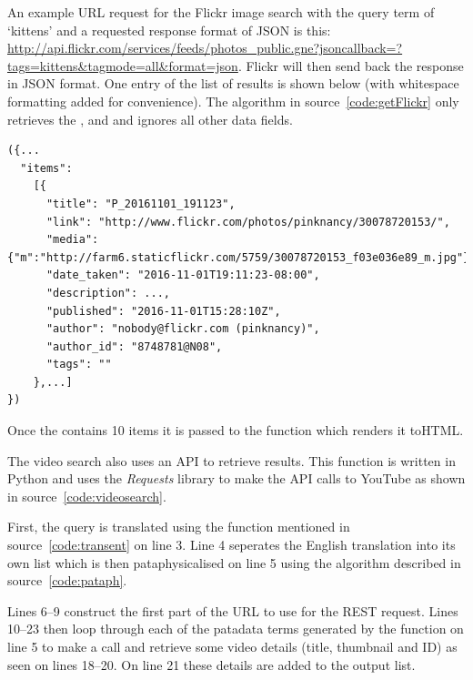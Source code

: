 \spirals

An example \ac{URL} request for the Flickr image search with the query term of `kittens' and a requested response format of \ac{JSON} is this:
\url{http://api.flickr.com/services/feeds/photos_public.gne?jsoncallback=?tags=kittens&tagmode=all&format=json}. Flickr will then send back the response in \ac{JSON} format. One entry of the list of results is shown below (with whitespace formatting added for convenience). The algorithm in source~\ref{code:getFlickr} only retrieves the ,  and  and ignores all other data fields.

\begin{verbatim}
({...
  "items": 
    [{
      "title": "P_20161101_191123",
      "link": "http://www.flickr.com/photos/pinknancy/30078720153/",
      "media": {"m":"http://farm6.staticflickr.com/5759/30078720153_f03e036e89_m.jpg"},
      "date_taken": "2016-11-01T19:11:23-08:00",
      "description": ...,
      "published": "2016-11-01T15:28:10Z",
      "author": "nobody@flickr.com (pinknancy)",
      "author_id": "8748781@N08",
      "tags": ""
    },...]
})
\end{verbatim}

Once the  contains 10 items it is passed to the  function which renders it to\ac{HTML}.

\spirals

The video search also uses an \ac{API} to retrieve results. This function is written in Python and uses the \textit{Requests} library to make the \ac{API} calls to YouTube \autocite{YouTubeAPI} as shown in source~\ref{code:videosearch}.

First, the query is translated using the  function mentioned in source~\ref{code:transent} on line 3. Line 4 seperates the English translation into its own list  which is then pataphysicalised on line 5 using the algorithm described in source~\ref{code:pataph}.

Lines 6--9 construct the first part of the \ac{URL} to use for the \ac{REST} request. Lines 10--23 then loop through each of the patadata terms generated by the  function on line 5 to make a call and retrieve some video details (title, thumbnail and ID) as seen on lines 18--20. On line 21 these details are added to the output list. 

